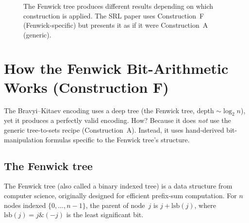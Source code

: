 \documentclass[11pt,a4paper]{article}
\theoremstyle{definition}
\begin{document}
\begin{figure}[h]
\centering
{}
\caption{The Fenwick tree produces different results depending on
which construction is applied.  The SRL paper uses Construction~F
(Fenwick-specific) but presents it as if it were Construction~A
(generic).}
\label{fig:fenwick-two-paths}
\end{figure}

\section{How the Fenwick Bit-Arithmetic Works (Construction F)}
\label{sec:construction-f}

The Bravyi--Kitaev encoding uses a deep tree (the Fenwick tree, depth
$\sim \log_2 n$), yet it produces a perfectly valid encoding.  How?
Because it does \emph{not} use the generic tree-to-sets recipe
(Construction~A).  Instead, it uses hand-derived bit-manipulation
formulas specific to the Fenwick tree's structure.

\subsection{The Fenwick tree}

The Fenwick tree (also called a binary indexed tree) is a data
structure from computer science, originally designed for efficient
prefix-sum computation.  For $n$ nodes indexed $\{0, \ldots, n{-}1\}$,
the parent of node~$j$ is $j + \mathrm{lsb}(j)$, where
$\mathrm{lsb}(j) = j \mathbin{\&} (-j)$ is the least significant bit.
\end{document}
